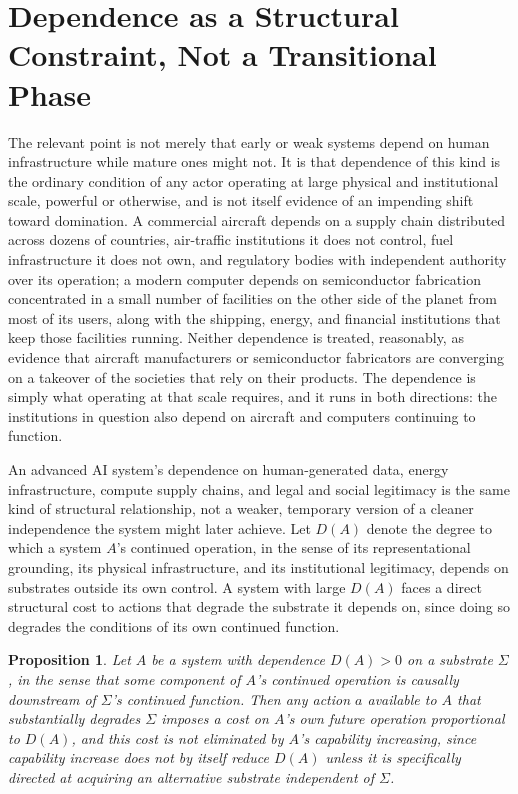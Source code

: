 \documentclass[11pt]{article}
\newtheorem{proposition}{Proposition}
\begin{document}
\section{Dependence as a Structural Constraint, Not a Transitional Phase}

The relevant point is not merely that early or weak systems depend on human infrastructure while mature ones might not. It is that dependence of this kind is the ordinary condition of any actor operating at large physical and institutional scale, powerful or otherwise, and is not itself evidence of an impending shift toward domination. A commercial aircraft depends on a supply chain distributed across dozens of countries, air-traffic institutions it does not control, fuel infrastructure it does not own, and regulatory bodies with independent authority over its operation; a modern computer depends on semiconductor fabrication concentrated in a small number of facilities on the other side of the planet from most of its users, along with the shipping, energy, and financial institutions that keep those facilities running. Neither dependence is treated, reasonably, as evidence that aircraft manufacturers or semiconductor fabricators are converging on a takeover of the societies that rely on their products. The dependence is simply what operating at that scale requires, and it runs in both directions: the institutions in question also depend on aircraft and computers continuing to function.

An advanced AI system's dependence on human-generated data, energy infrastructure, compute supply chains, and legal and social legitimacy is the same kind of structural relationship, not a weaker, temporary version of a cleaner independence the system might later achieve. Let $D(A)$ denote the degree to which a system $A$'s continued operation, in the sense of its representational grounding, its physical infrastructure, and its institutional legitimacy, depends on substrates outside its own control. A system with large $D(A)$ faces a direct structural cost to actions that degrade the substrate it depends on, since doing so degrades the conditions of its own continued function.

\begin{proposition}
Let $A$ be a system with dependence $D(A) > 0$ on a substrate $\Sigma$, in the sense that some component of $A$'s continued operation is causally downstream of $\Sigma$'s continued function. Then any action $a$ available to $A$ that substantially degrades $\Sigma$ imposes a cost on $A$'s own future operation proportional to $D(A)$, and this cost is not eliminated by $A$'s capability increasing, since capability increase does not by itself reduce $D(A)$ unless it is specifically directed at acquiring an alternative substrate independent of $\Sigma$.
\end{proposition}
\end{document}
